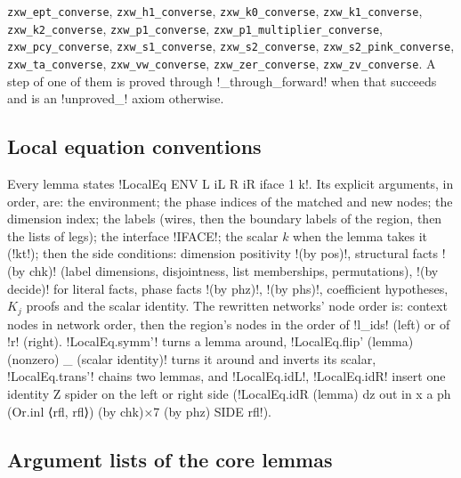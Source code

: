 {\texttt{zxw\_\allowbreak{}ept\_\allowbreak{}converse}, \texttt{zxw\_\allowbreak{}h1\_\allowbreak{}converse}, \texttt{zxw\_\allowbreak{}k0\_\allowbreak{}converse}, \texttt{zxw\_\allowbreak{}k1\_\allowbreak{}converse}, \texttt{zxw\_\allowbreak{}k2\_\allowbreak{}converse}, \texttt{zxw\_\allowbreak{}p1\_\allowbreak{}converse}, \texttt{zxw\_\allowbreak{}p1\_\allowbreak{}multiplier\_\allowbreak{}converse}, \texttt{zxw\_\allowbreak{}pcy\_\allowbreak{}converse}, \texttt{zxw\_\allowbreak{}s1\_\allowbreak{}converse}, \texttt{zxw\_\allowbreak{}s2\_\allowbreak{}converse}, \texttt{zxw\_\allowbreak{}s2\_\allowbreak{}pink\_\allowbreak{}converse}, \texttt{zxw\_\allowbreak{}ta\_\allowbreak{}converse}, \texttt{zxw\_\allowbreak{}vw\_\allowbreak{}converse}, \texttt{zxw\_\allowbreak{}zer\_\allowbreak{}converse}, \texttt{zxw\_\allowbreak{}zv\_\allowbreak{}converse}. A step of one of them is proved through \py!_through_forward! when that succeeds and is an \code!unproved_! axiom otherwise.

\subsection{Local equation conventions}\label{sec:lean-export-net-conventions}

Every lemma states \lean!LocalEq ENV L iL R iR iface 1 k!. Its explicit arguments, in order, are:
the environment; the phase indices of the matched and new nodes; the dimension index; the labels
(wires, then the boundary labels of the region, then the lists of legs); the interface
\code!IFACE!; the scalar $k$ when the lemma takes it (\code!kt!); then the side conditions:
dimension positivity \code!(by pos)!, structural facts \code!(by chk)! (label dimensions,
disjointness, list memberships, permutations), \code!(by decide)! for literal facts, phase facts
\code!(by phz)!, \code!(by phs)!, coefficient hypotheses, $K_j$ proofs and the scalar identity.
The rewritten networks' node order is: context nodes in network order, then the region's nodes in
the order of \py!l_ids! (left) or of \py!r! (right). \code!LocalEq.symm'! turns a lemma around,
\code!LocalEq.flip' (lemma) (nonzero) _ (scalar identity)! turns it around and inverts its scalar,
\code!LocalEq.trans'! chains two lemmas, and \code!LocalEq.idL!, \code!LocalEq.idR! insert one
identity Z spider on the left or right side
(\code!LocalEq.idR (lemma) dz out in x a ph (Or.inl ⟨rfl, rfl⟩) (by chk)×7 (by phz) SIDE rfl!).

\subsection{Argument lists of the core lemmas}\label{sec:lean-export-net-arglists}

}
